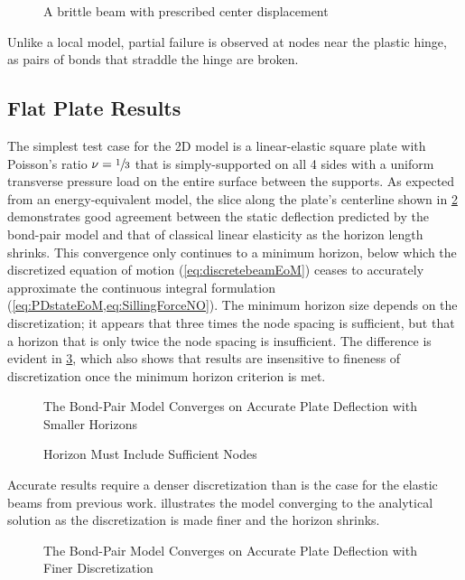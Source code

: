 \begin{figure}[h]
  \centering
  \resizebox{0.7\linewidth}{!}{}
  \caption{A brittle beam with prescribed center displacement}
  \label{fig:brittleBeam}
\end{figure}

Unlike a local model, partial failure is observed at nodes near the plastic hinge, as pairs of bonds that straddle the hinge are broken.

\FloatBarrier
\subsection{Flat Plate Results}

The simplest test case for the 2D model is a linear-elastic square plate with Poisson's ratio \(\nu = \sfrac{1}{3}\) that is simply-supported on all 4 sides with a uniform transverse pressure load on the entire surface between the supports.  As expected from an energy-equivalent model, the slice along the plate's centerline shown in \cref{fig:plate_convergence_h} demonstrates good agreement between the static deflection predicted by the bond-pair model and that of classical linear elasticity as the horizon length shrinks.  This convergence only continues to a minimum horizon, below which the discretized equation of motion (\cref{eq:discretebeamEoM}) ceases to accurately approximate the continuous integral formulation (\cref{eq:PDstateEoM,eq:SillingForceNO}).  The minimum horizon size depends on the discretization; it appears that three times the node spacing is sufficient, but that a horizon that is only twice the node spacing is insufficient.  The difference is evident in \cref{fig:plate_minimum_h}, which also shows that results are insensitive to fineness of discretization once the minimum horizon criterion is met.
%
\begin{figure}[h]
  \centering
  \resizebox{0.6\linewidth}{!}{}
  \caption{The Bond-Pair Model Converges on Accurate Plate Deflection with Smaller Horizons}
  \label{fig:plate_convergence_h}
\end{figure}
%
\begin{figure}[h]
  \centering
  \resizebox{0.6\linewidth}{!}{}
  \caption{Horizon Must Include Sufficient Nodes}
  \label{fig:plate_minimum_h}
\end{figure}
%
Accurate results require a denser discretization than is the case for the elastic beams from previous work.   illustrates the model converging to the analytical solution as the discretization is made finer and the horizon shrinks.
%
\begin{figure}[tbp]
  \centering
  \resizebox{0.6\linewidth}{!}{}
  \caption{The Bond-Pair Model Converges on Accurate Plate Deflection with Finer Discretization}
  \label{fig:plate_convergence_n}
\end{figure}

